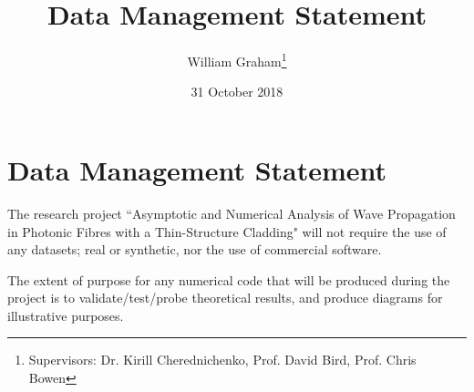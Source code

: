 \documentclass{article}
\title{Data Management Statement}
\author{William Graham\footnote{Supervisors: Dr. Kirill Cherednichenko, Prof. David Bird, Prof. Chris Bowen}}
\date{31 October 2018}
\begin{document}
\maketitle

\section*{Data Management Statement}

The research project ``Asymptotic and Numerical Analysis of Wave Propagation in Photonic Fibres with a Thin-Structure Cladding" will not require the use of any datasets; real or synthetic, nor the use of commercial software.

The extent of purpose for any numerical code that will be produced during the project is to validate/test/probe theoretical results, and produce diagrams for illustrative purposes.
\end{document}
